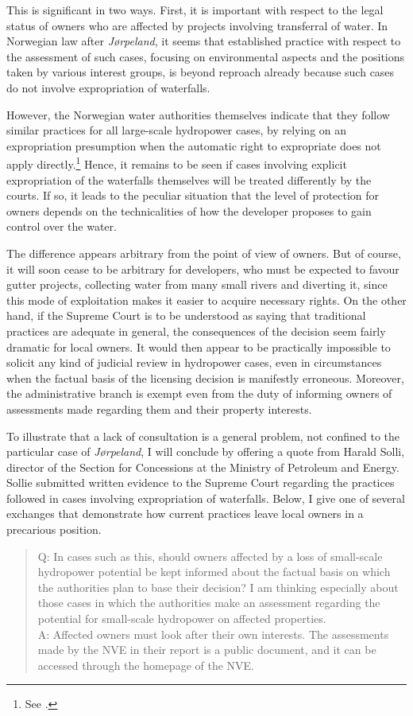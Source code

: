 This is significant in two ways. First, it is important with respect to the legal status of owners who are affected by projects involving transferral of water. In Norwegian law after {\it Jørpeland}, it seems that established practice with respect to the assessment of such cases, focusing on environmental aspects and the positions taken by various interest groups, is beyond reproach already because such cases do not involve expropriation of waterfalls. 

However, the Norwegian water authorities themselves indicate that they follow similar practices for all large-scale hydropower cases, by relying on an expropriation presumption when the automatic right to expropriate does not apply directly.\footnote{See \cite{flatby08}.} Hence, it remains to be seen if cases involving explicit expropriation of the waterfalls themselves will be treated differently by the courts. If so, it leads to the peculiar situation that the level of protection for owners depends on the technicalities of how the developer proposes to gain control over the water.

The difference appears arbitrary from the point of view of owners. But of course, it will soon cease to be arbitrary for developers, who must be expected to favour gutter projects, collecting water from many small rivers and diverting it, since this mode of exploitation makes it easier to acquire necessary rights. On the other hand, if the Supreme Court is to be understood as saying that traditional practices are adequate in general, the consequences of the decision seem fairly dramatic for local owners. It would then appear to be practically impossible to solicit any kind of judicial review in hydropower cases, even in circumstances when the factual basis of the licensing decision is manifestly erroneous. Moreover, the administrative branch is exempt even from the duty of informing owners of assessments made regarding them and their property interests.

To illustrate that a lack of consultation is a general problem, not confined to the particular case of {\it Jørpeland}, I will conclude by offering a quote from Harald Solli, director of the Section for Concessions at the Ministry of Petroleum and Energy. Sollie submitted written evidence to the Supreme Court regarding the practices followed in cases involving expropriation of waterfalls. Below, I give one of several exchanges that demonstrate how current practices leave local owners in a precarious position.

\begin{quote}
Q: In cases such as this, should owners affected by a loss of small-scale hydropower potential be kept informed about the factual basis on which the authorities plan to base their decision? I am thinking especially about those cases in which the authorities make an assessment regarding the potential for small-scale hydropower on affected properties. \\
A: Affected owners must look after their own interests. The assessments made by the NVE in their report is a public document, and it can be accessed through the homepage of the NVE.
\end{quote}

